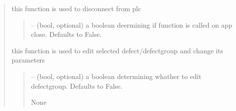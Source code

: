 \documentclass[letterpaper,10pt,english]{sphinxmanual}
\begin{document}
\begin{quote}
\begin{savenotes}
\begin{fulllineitems}
\begin{savenotes}\begin{fulllineitems}
\label{\detokenize{setting/setting_api:oxin.setting_api.API.disconnect_plc}}
\pysigstartsignatures
{}
\pysigstopsignatures
\sphinxAtStartPar
this function is used to disconnect from plc
\begin{quote}\begin{description}
\sphinxAtStartPar
{} – (bool, optional) a boolean deermining if function is called on app close. Defaults to False.

\end{description}\end{quote}

\end{fulllineitems}\end{savenotes}


\begin{savenotes}\begin{fulllineitems}
\label{\detokenize{setting/setting_api:oxin.setting_api.API.edit_defects}}
\pysigstartsignatures
{}
\pysigstopsignatures
\sphinxAtStartPar
this function is used to edit selected defect/defect\sphinxhyphen{}group and change its parameters
\begin{quote}\begin{description}
\sphinxAtStartPar
{} – (bool, optional) a boolean determining whather to edit defect\sphinxhyphen{}group. Defaults to False.

\sphinxAtStartPar
None

\end{description}\end{quote}

\end{fulllineitems}\end{savenotes}



\end{fulllineitems}
\end{savenotes}
\end{quote}
\end{document}

